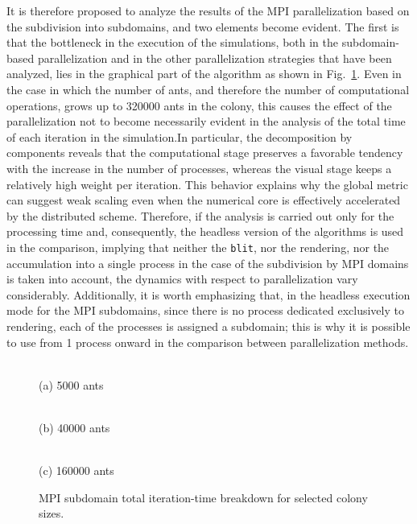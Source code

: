 It is therefore proposed to analyze the results of the MPI parallelization based on the subdivision into subdomains, and two elements become evident. The first is that the bottleneck in the execution of the simulations, both in the subdomain-based parallelization and in the other parallelization strategies that have been analyzed, lies in the graphical part of the algorithm as shown in Fig.~\ref{fig:mpi_total_breakdown_selected}. Even in the case in which the number of ants, and therefore the number of computational operations, grows up to 320000 ants in the colony, this causes the effect of the parallelization not to become necessarily evident in the analysis of the total time of each iteration in the simulation.In particular, the decomposition by components reveals that the computational stage preserves a favorable tendency with the increase in the number of processes, whereas the visual stage keeps a relatively high weight per iteration. This behavior explains why the global metric can suggest weak scaling even when the numerical core is effectively accelerated by the distributed scheme. Therefore, if the analysis is carried out only for the processing time and, consequently, the headless version of the algorithms is used in the comparison, implying that neither the \texttt{blit}, nor the rendering, nor the accumulation into a single process in the case of the subdivision by MPI domains is taken into account, the dynamics with respect to parallelization vary considerably. Additionally, it is worth emphasizing that, in the headless execution mode for the MPI subdomains, since there is no process dedicated exclusively to rendering, each of the processes is assigned a subdomain; this is why it is possible to use from 1 process onward in the comparison between parallelization methods. 
\begin{figure}[!htbp]
\centering
\begin{minipage}{0.48\columnwidth}
    \centering
    \\[-2mm]
    {\footnotesize (a) 5000 ants}
\end{minipage}
\hfill
\begin{minipage}{0.48\columnwidth}
    \centering
    \\[-2mm]
    {\footnotesize (b) 40000 ants}
\end{minipage}

\vspace{1mm}
\begin{minipage}{0.62\columnwidth}
    \centering
    \\[-2mm]
    {\footnotesize (c) 160000 ants}
\end{minipage}
\caption{MPI subdomain total iteration-time breakdown for selected colony sizes.}
\label{fig:mpi_total_breakdown_selected}
\end{figure}

